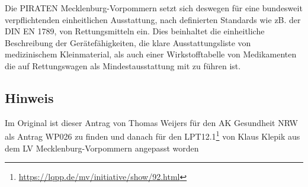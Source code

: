 Die PIRATEN Mecklenburg-Vorpommern setzt sich deswegen für eine bundesweit verpflichtenden einheitlichen Ausstattung, nach definierten Standards wie zB. der DIN EN 1789, von Rettungsmitteln ein. Dies beinhaltet die einheitliche Beschreibung der Gerätefähigkeiten, die klare Ausstattungsliste von medizinischem Kleinmaterial, als auch einer Wirkstofftabelle von Medikamenten die auf Rettungswagen als Mindestausstattung mit zu führen ist.

\subsection{Hinweis}

Im Original ist dieser Antrag von Thomas Weijers für den AK Gesundheit NRW als Antrag WP026 zu finden und danach für den LPT12.1\footnote{\url{https://lqpp.de/mv/initiative/show/92.html}} von Klaus Klepik aus dem LV Mecklenburg-Vorpommern angepasst worden

